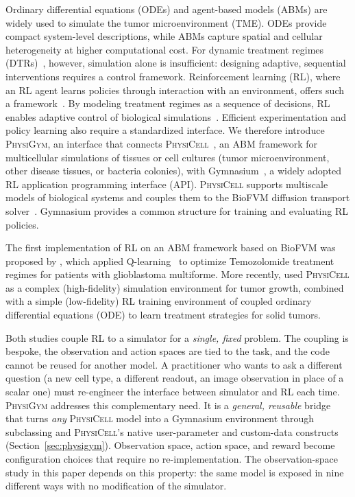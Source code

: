 \documentclass{article}
\newcommand{\physigym}{\textsc{PhysiGym}}
\newcommand{\physicell}{\textsc{PhysiCell}}
\begin{document}
Ordinary differential equations (ODEs) and agent-based models (ABMs) are widely
used to simulate the tumor microenvironment (TME). ODEs provide compact
system-level descriptions, while ABMs capture spatial and cellular
heterogeneity at higher computational cost. For dynamic treatment regimes
(DTRs)~\citep{gray1982arac}, however, simulation alone is insufficient:
designing adaptive, sequential interventions requires a control framework.
Reinforcement learning (RL), where an RL agent learns policies through
interaction with an environment, offers such a framework~\citep{barto1989learning}.
By modeling treatment regimes as a sequence of decisions, RL enables adaptive
control of biological simulations~\citep{chakraborty2014dynamic}. Efficient
experimentation and policy learning also require a standardized interface. We
therefore introduce \physigym{}, an interface that connects
\physicell{}~\citep{ghaffarizadeh2018physicell}, an ABM framework for
multicellular simulations of tissues or cell cultures (tumor microenvironment,
other disease tissues, or bacteria colonies), with
Gymnasium~\citep{towers2024gymnasium}, a widely adopted RL application
programming interface (API).
\physicell{} supports multiscale models of biological systems and couples them
to the BioFVM diffusion transport solver~\citep{ghaffarizadeh2016biofvm}.
Gymnasium provides a common structure for training and evaluating RL policies.

The first implementation of RL on an ABM framework based on BioFVM was proposed
by \citet{zade2020reinforcement}, which applied Q-learning~\citep{watkins1992q}
to optimize Temozolomide treatment regimes for patients with glioblastoma
multiforme.
More recently, \citet{aif2025failing} used \physicell{} as a complex
(high-fidelity) simulation environment for tumor growth, combined with a simple
(low-fidelity) RL training environment of coupled ordinary differential
equations (ODE) to learn treatment strategies for solid tumors.

\newpage
Both studies couple RL to a simulator for a \emph{single, fixed} problem. The
coupling is bespoke, the observation and action spaces are tied to the task, and
the code cannot be reused for another model. A practitioner who wants to ask a
different question (a new cell type, a different readout, an image observation in
place of a scalar one) must re-engineer the interface between simulator and RL
each time. \physigym{} addresses this complementary need. It is a
\emph{general, reusable} bridge that turns \emph{any} \physicell{} model into a
Gymnasium environment through subclassing and \physicell{}'s native user-parameter
and custom-data constructs (Section~\ref{sec:physigym}). Observation space,
action space, and reward become configuration choices that require no
re-implementation. The observation-space study in this paper depends on this
property: the same model is exposed in nine different ways with no modification
of the simulator.
\end{document}
